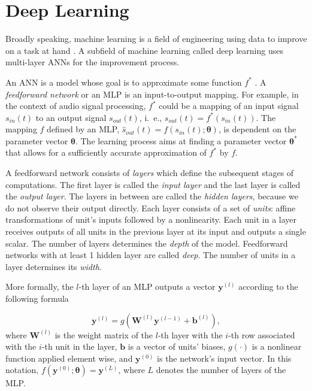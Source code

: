 
\section{Deep Learning}
\label{section:deep_learning}

Broadly speaking, machine learning is a field of engineering using data to improve on a task at hand \cite{Goodfellow-et-al-2016}. A subfield of machine learning called deep learning uses multi-layer \acp{ANN} for the improvement process. 

An \ac{ANN} is a model whose goal is to approximate some function $f^*$ \cite{Goodfellow-et-al-2016}. A \emph{feedforward network} or an \ac{MLP} is an input-to-output mapping. For example, in the context of audio signal processing, $f^*$ could be a mapping of an input signal $s_{in}(t)$ to an output signal $s_{out}(t)$, i.\ e., $s_{out}(t) = f^*(s_{in}(t))$. The mapping $f$ defined by an \ac{MLP}, $\hat{s}_{out}(t) = f(s_{in}(t); \pmb{\theta})$, is dependent on the parameter vector $\pmb{\theta}$. The learning process aims at finding a parameter vector $\pmb{\theta^*}$ that allows for a sufficiently accurate approximation of $f^*$ by $f$.


A feedforward network consists of \emph{layers} which define the subsequent stages of computations. The first layer is called the \emph{input layer} and the last layer is called the \emph{output layer}. The layers in between are called the \emph{hidden layers}, because we do not observe their output directly. Each layer consists of a set of \emph{units}: affine transformations of unit's inputs followed by a nonlinearity. Each unit in a layer receives outputs of all units in the previous layer at its input and outputs a single scalar. The number of layers determines the \emph{depth} of the model. Feedforward networks with at least 1 hidden layer are called \emph{deep}. The number of units in a layer determines its \emph{width}.

More formally, the $l$-th layer of an \ac{MLP} outputs a vector $\pmb{y}^{(l)}$ according to the following formula

\begin{equation}
  \pmb{y}^{(l)} = g ( \pmb{W}^{(l)} \pmb{y}^{(l-1)} + \pmb{b}^{(l)}),
  \label{eq:mlp_forward_pass}
\end{equation}
where $\pmb{W}^{(l)}$ is the weight matrix of the $l$-th layer with the $i$-th row associated with the $i$-th unit in the layer, $\pmb{b}$ is a vector of units' biases, $g(\cdot)$ is a nonlinear function applied element wise, and $\pmb{y}^{(0)}$ is the network's input vector. In this notation, $f(\pmb{y}^{(0)};\pmb{\theta}) = \pmb{y}^{(L)}$, where $L$ denotes the number of layers of the \ac{MLP}.

